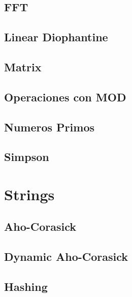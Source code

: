 \subsection{FFT}
\raggedbottom
\hrulefill
\subsection{Linear Diophantine}
\raggedbottom
\hrulefill
\subsection{Matrix}
\raggedbottom
\hrulefill
\subsection{Operaciones con MOD}
\raggedbottom
\hrulefill
\subsection{Numeros Primos}
\raggedbottom
\hrulefill
\subsection{Simpson}
\raggedbottom
\hrulefill
\newpage

\section{Strings}
\subsection{Aho-Corasick}
\raggedbottom
\hrulefill
\subsection{Dynamic Aho-Corasick}
\raggedbottom
\hrulefill
\subsection{Hashing}
\raggedbottom
\hrulefill
